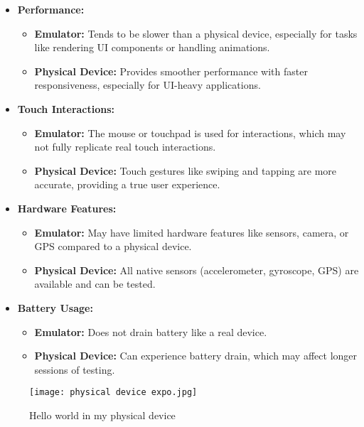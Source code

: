 \documentclass{article}
\begin{document}
\begin{itemize}
    \item \textbf{Performance:}
    \begin{itemize}
        \item \textbf{Emulator:} Tends to be slower than a physical device, especially for tasks like rendering UI components or handling animations.
        \item \textbf{Physical Device:} Provides smoother performance with faster responsiveness, especially for UI-heavy applications.
    \end{itemize}

    \item \textbf{Touch Interactions:}
    \begin{itemize}
        \item \textbf{Emulator:} The mouse or touchpad is used for interactions, which may not fully replicate real touch interactions.
        \item \textbf{Physical Device:} Touch gestures like swiping and tapping are more accurate, providing a true user experience.
    \end{itemize}

    \item \textbf{Hardware Features:}
    \begin{itemize}
        \item \textbf{Emulator:} May have limited hardware features like sensors, camera, or GPS compared to a physical device.
        \item \textbf{Physical Device:} All native sensors (accelerometer, gyroscope, GPS) are available and can be tested.
    \end{itemize}

    \item \textbf{Battery Usage:}
    \begin{itemize}
        \item \textbf{Emulator:} Does not drain battery like a real device.
        \item \textbf{Physical Device:} Can experience battery drain, which may affect longer sessions of testing.
    \end{itemize}
\end{itemize}

\begin{figure}[ht]
    \centering
    \texttt{[image: physical device expo.jpg]}
    \caption{Hello world in my physical device}
    \label{fig:enter-label}
\end{figure}
\\
\end{document}
